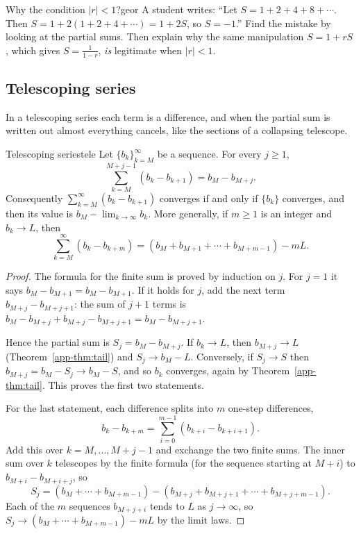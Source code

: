 \documentclass[11pt]{article}
\begin{document}
\begin{think}{Why the condition $|r|<1$?}{geor}
A student writes: ``Let $S=1+2+4+8+\cdots$. Then $S=1+2(1+2+4+\cdots)=1+2S$, so $S=-1$.'' Find the mistake by looking at the partial sums. Then explain why the same manipulation $S=1+rS$, which gives $S=\frac1{1-r}$, \emph{is} legitimate when $|r|<1$.
\end{think}

\subsection*{Telescoping series}

In a telescoping series each term is a difference, and when the partial sum is written out almost everything cancels, like the sections of a collapsing telescope.

\begin{thm}{Telescoping series}{tele}
Let $\{b_k\}_{k=M}^\infty$ be a sequence. For every $j\ge1$,
\[
\sum_{k=M}^{M+j-1}\left(b_k-b_{k+1}\right)=b_M-b_{M+j}.
\]
Consequently $\sum_{k=M}^\infty(b_k-b_{k+1})$ converges if and only if $\{b_k\}$ converges, and then its value is $b_M-\lim_{k\to\infty}b_k$. More generally, if $m\ge1$ is an integer and $b_k\to L$, then
\[
\sum_{k=M}^\infty\left(b_k-b_{k+m}\right)=\left(b_M+b_{M+1}+\cdots+b_{M+m-1}\right)-mL .
\]
\end{thm}
\begin{proof}
The formula for the finite sum is proved by induction on $j$. For $j=1$ it says $b_M-b_{M+1}=b_M-b_{M+1}$. If it holds for $j$, add the next term $b_{M+j}-b_{M+j+1}$: the sum of $j+1$ terms is $b_M-b_{M+j}+b_{M+j}-b_{M+j+1}=b_M-b_{M+j+1}$.

Hence the partial sum is $S_j=b_M-b_{M+j}$. If $b_k\to L$, then $b_{M+j}\to L$ (Theorem~\ref{app-thm:tail}) and $S_j\to b_M-L$. Conversely, if $S_j\to S$ then $b_{M+j}=b_M-S_j\to b_M-S$, and so $b_k$ converges, again by Theorem~\ref{app-thm:tail}. This proves the first two statements.

For the last statement, each difference splits into $m$ one-step differences,
\[
b_k-b_{k+m}=\sum_{i=0}^{m-1}\left(b_{k+i}-b_{k+i+1}\right).
\]
Add this over $k=M,\dots,M+j-1$ and exchange the two finite sums. The inner sum over $k$ telescopes by the finite formula (for the sequence starting at $M+i$) to $b_{M+i}-b_{M+i+j}$, so
\[
S_j=\left(b_M+\cdots+b_{M+m-1}\right)-\left(b_{M+j}+b_{M+j+1}+\cdots+b_{M+j+m-1}\right).
\]
Each of the $m$ sequences $b_{M+j+i}$ tends to $L$ as $j\to\infty$, so $S_j\to(b_M+\cdots+b_{M+m-1})-mL$ by the limit laws.
\end{proof}
\end{document}
